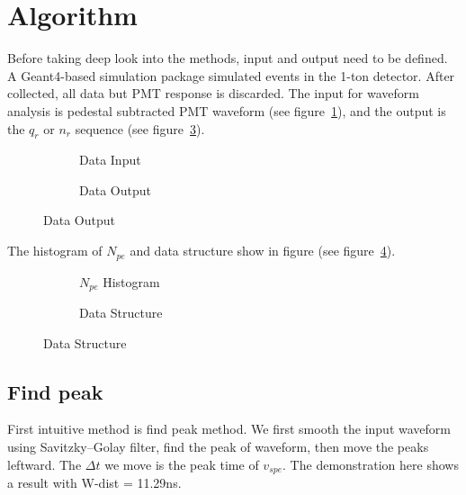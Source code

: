 \section{Algorithm} %

Before taking deep look into the methods, input and output need to be defined. A Geant4\cite{agostinelli_geant4simulation_2003}-based simulation package simulated events in the 1-ton detector\cite{wang_design_2017}. After collected, all data but PMT response is discarded. The input for waveform analysis is pedestal subtracted PMT waveform (see figure~\ref{fig:input}), and the output is the $q_{r}$ or $n_{r}$ sequence (see figure~\ref{fig:output}). 

\begin{figure}[H]
\begin{minipage}[b]{.5\textwidth}
\begin{figure}[H]
    \centering
    \resizebox{\textwidth}{!}{}
    \caption{\label{fig:input} Data Input}
\end{figure}
\end{minipage}
\begin{minipage}[b]{.5\textwidth}
\begin{figure}[H]
    \centering
    \resizebox{\textwidth}{!}{}
    \caption{\label{fig:output} Data Output}
\end{figure}
\end{minipage}
\end{figure}

The histogram of $N_{pe}$ and data structure show in figure (see figure~\ref{fig:penum}). 

\begin{figure}[H]
\begin{minipage}[b]{.51\textwidth}
\begin{figure}[H]
    \centering
    \resizebox{\textwidth}{!}{}
    \caption{\label{fig:penum} $N_{pe}$ Histogram}
\end{figure}
\end{minipage}
\begin{minipage}[b]{.49\textwidth}
\begin{figure}[H]
    \centering
    \resizebox{\textwidth}{!}{}
    \caption{\label{fig:set} Data Structure}
\end{figure}
\end{minipage}
\end{figure}

\subsection{Find peak}
First intuitive method is find peak method. We first smooth the input waveform using Savitzky–Golay filter, find the peak of waveform, then move the peaks leftward. The $\Delta t$ we move is the peak time of $v_{spe}$. The demonstration here shows a result with W-dist = 11.29ns. 


